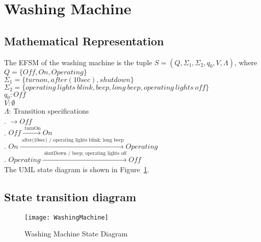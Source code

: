 \newpage
\section{Washing Machine}

\subsection{Mathematical Representation}

\noindent The EFSM of the washing machine is the tuple $S = (Q, \Sigma_1, \Sigma_2, q_0, V, \Lambda)$, where\\

\noindent $Q = \{Off, On, Operating\}$\\
\noindent $\Sigma_1 = \{turn on, after(10sec), shut down\}$\\
\noindent $\Sigma_2 = \{operating~lights~blink, beep, long~beep, operating~lights~off\}$\\
\noindent $q_0: Off$\\
\noindent $V: \emptyset$\\
\noindent $\Lambda$: Transition specifications\\
. $\rightarrow Off$\\
. $Off \xrightarrow {\text { turnOn}} On$\\
. $On \xrightarrow {\text { after(10sec) / operating lights blink; long beep}} Operating$\\
. $Operating \xrightarrow {\text { shutDown / beep; operating lights off}} Off$\\

\noindent The UML state diagram is shown in Figure~\ref{fig:washingMachine}.


\subsection{State transition diagram}

\begin{figure}[h!]
	\centering
		\texttt{[image: WashingMachine]}
		  \caption{Washing Machine State Diagram}
  \label{fig:washingMachine}
\end{figure}
